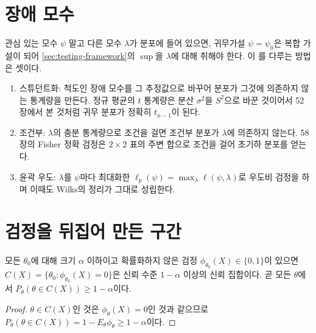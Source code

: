 \section{장애 모수}
\label{sec:nuisance}

관심 있는 모수 $\psi$ 말고 다른 모수 $\lambda$가 분포에 들어 있으면, 귀무가설 $\psi=\psi_0$은 복합 가설이 되어 \cref{sec:testing-framework}의 $\sup$을 $\lambda$에 대해 취해야 한다. 이 를 다루는 방법은 셋이다.
\begin{enumerate}
\item 스튜던트화: 척도인 장애 모수를 그 추정값으로 바꾸어 분포가 그것에 의존하지 않는 통계량을 만든다. 정규 평균의 $t$ 통계량은 분산 $\sigma^2$을 $S^2$으로 바꾼 것이어서 52장에서 본 것처럼 귀무 분포가 정확히 $t_{n-1}$이 된다.
\item 조건부: $\lambda$의 충분 통계량으로 조건을 걸면 조건부 분포가 $\lambda$에 의존하지 않는다. 58장의 Fisher 정확 검정은 $2\times2$ 표의 주변 합으로 조건을 걸어 초기하 분포를 얻는다.
\item 윤곽 우도: $\lambda$를 $\psi$마다 최대화한 $\ell_p(\psi)=\max_\lambda\ell(\psi,\lambda)$로 우도비 검정을 하며 이때도 Wilks의 정리가 그대로 성립한다.
\end{enumerate}

\section{검정을 뒤집어 만든 구간}
\label{sec:test-inversion}

\begin{proposition}
\label{prop:test-inversion}
모든 $\theta_0$에 대해 크기 $\alpha$ 이하이고 확률화하지 않은 검정 $\phi_{\theta_0}(X)\in\{0,1\}$이 있으면 $C(X)=\{\theta_0:\phi_{\theta_0}(X)=0\}$은 신뢰 수준 $1-\alpha$ 이상의 신뢰 집합이다. 곧 모든 $\theta$에서 $P_\theta(\theta\in C(X))\ge1-\alpha$이다.
\end{proposition}

\begin{proof}
$\theta\in C(X)$인 것은 $\phi_\theta(X)=0$인 것과 같으므로 $P_\theta(\theta\in C(X))=1-E_\theta\phi_\theta\ge1-\alpha$이다.
\end{proof}

